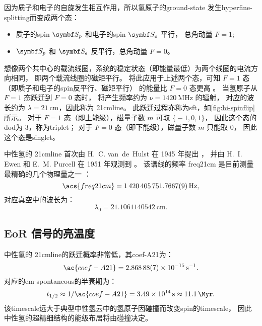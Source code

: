 因为质子和电子的自旋发生相互作用，所以氢原子的\ac{ground-state}
发生\ac{hyperfine-splitting}而变成两个态：
\begin{itemize}
  \item 质子的\ac{spin} $\B{S}_p$ 和电子的\ac{spin} $\B{S}_e$ 平行，
    总角动量 $F = 1$;
  \item $\B{S}_p$ 和 $\B{S}_e$ 反平行，总角动量 $F = 0$。
\end{itemize}
想像两个共中心的载流线圈，系统的稳定状态（即能量最低）为两个线圈的电流方向相同，
即两个载流线圈的磁矩平行。
将此应用于上述两个态，可知 $F = 1$ 态（即质子和电子的\ac{spin}反平行、磁矩平行）
的能量比 $F = 0$ 态更高 \cite{griffiths1982}。
当氢原子从 $F = 1$ 态跃迁到 $F = 0$ 态时，
将产生频率约为 $\nu = \SI{1420}{\MHz}$ 的辐射，
对应的波长约为 $\lambda = \SI{21}{\cm}$，因此称为 \acf{21cmline}。
此跃迁过程亦称为\acf{sft}，如\autoref{fig:hi-spinflip} 所示。
对于 $F = 1$ 态（即上能级），磁量子数 $m$ 可取 $\big\{ -1, 0, 1 \big\}$，
因此这个态的\ac{dod}为 3，称为\acf{triplet}；
对于 $F = 0$ 态（即下能级），磁量子数 $m$ 只能取 0，
因此这个态是\acf{singlet}。

中性氢的 \ac{21cmline}%
首次由 H.~C. van~de~Hulst 在 1945 年提出 \cite{vanDeHulst1945}，
并由 H.~I. Ewen 和 E.~M. Purcell 在 1951 年观测到 \cite{ewen1951}。
该谱线的频率 \ac{freq21cm} 是目前测量最精确的几个物理量之一
\cite{hellwig1970,essen1971}：
\begin{equation}
  \label{eq:hi-line-frequency}
  \acs{freq21cm} = \SI{1420405751.7667 +- 0.0009}{\Hz} ,
\end{equation}
对应真空中的波长为：
\begin{equation}
  \label{eq:hi-line-wavelength}
  \lambda_0 = \SI{21.1061140542}{\cm} .
\end{equation}

\subsection{EoR 信号的亮温度}

中性氢的 \ac{21cmline}的跃迁概率非常低，其\acl{coef-A21}为：
\begin{equation}
  \ac{coef-A21} =
    \SI[separate-uncertainty=false]{2.86888(7)e-15}{\per\second} .
\end{equation}
对应的\ac{em-spontaneous}的半衰期为：
\begin{equation}
  t_{1/2} \approx 1 / \ac{coef-A21}
    = \SI{3.49e14}{\second} \approx \SI{11.1}{\Myr} .
\end{equation}
该\ac{timescale}远大于典型中性氢云中的氢原子因碰撞而改变\ac{spin}的\ac{timescale}，
因此中性氢的超精细结构的能级布居将由碰撞决定。

